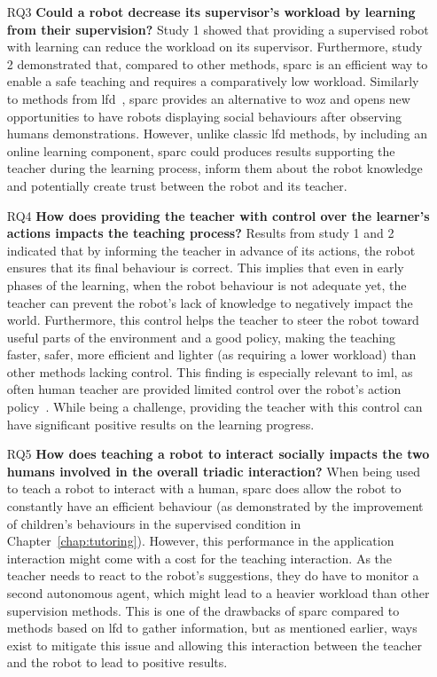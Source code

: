 \begin{itemize}
\item [RQ3] \textbf{Could a robot decrease its supervisor's workload by learning from their supervision?}
Study 1 showed that providing a supervised robot with learning can reduce the workload on its supervisor. Furthermore, study 2 demonstrated that, compared to other methods, \gls{sparc} is an efficient way to enable a safe teaching and requires a comparatively low workload. Similarly to methods from \gls{lfd}~\citep{liu2014train,sequeira2016discovering}, \gls{sparc} provides an alternative to \gls{woz} and opens new opportunities to have robots displaying social behaviours after observing humans demonstrations. However, unlike classic \gls{lfd} methods, by including an online learning component, \gls{sparc} could produces results supporting the teacher during the learning process, inform them about the robot knowledge and potentially create trust between the robot and its teacher.

\item [RQ4] \textbf{How does providing the teacher with control over the learner's actions impacts the teaching process?} 
Results from study 1 and 2 indicated that by informing the teacher in advance of its actions, the robot ensures that its final behaviour is correct. This implies that even in early phases of the learning, when the robot behaviour is not adequate yet, the teacher can prevent the robot's lack of knowledge to negatively impact the world. Furthermore, this control helps the teacher to steer the robot toward useful parts of the environment and a good policy, making the teaching faster, safer, more efficient and lighter (as requiring a lower workload) than other methods lacking control. This finding is especially relevant to \gls{iml}, as often human teacher are provided limited control over the robot's action policy~\citep{thomaz2008teachable,knox2009interactively}. While being a challenge, providing the teacher with this control can have significant positive results on the learning progress.

\item [RQ5] \textbf{How does teaching a robot to interact socially impacts the two humans involved in the overall triadic interaction?}
When being used to teach a robot to interact with a human, \gls{sparc} does allow the robot to constantly have an efficient behaviour (as demonstrated by the improvement of children's behaviours in the supervised condition in Chapter~\ref{chap:tutoring}). However, this performance in the application interaction might come with a cost for the teaching interaction. As the teacher needs to react to the robot's suggestions, they do have to monitor a second autonomous agent, which might lead to a heavier workload than other supervision methods. This is one of the drawbacks of \gls{sparc} compared to methods based on \gls{lfd} to gather information, but as mentioned earlier, ways exist to mitigate this issue and allowing this interaction between the teacher and the robot to lead to positive results.


\end{itemize}
